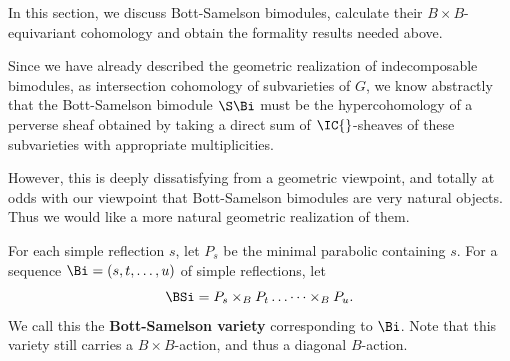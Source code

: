 \documentclass[12pt]{wart}
\newtheorem{prop}[thm]{Proposition}
\theoremstyle{remark}
\begin{document}
In this section, we discuss Bott-Samelson bimodules, calculate their
$B \times B$-equivariant cohomology and obtain the formality results
needed above.

Since we have already described the geometric realization of
indecomposable bimodules, as intersection cohomology of subvarieties
of $G$, we know abstractly that the Bott-Samelson bimodule $\S\Bi$
must be the hypercohomology of a perverse sheaf obtained by taking a
direct sum of $\IC{}$-sheaves of these subvarieties with appropriate
multiplicities.

However, this is deeply dissatisfying from a geometric viewpoint, and
totally at odds with our viewpoint that Bott-Samelson bimodules are
very natural objects. Thus we would like a more natural geometric
realization of them.

For each simple reflection $s$, let $P_s$ be the minimal parabolic containing $s$. For a sequence $\Bi = (s, t,  \dots, u)$ of simple reflections, let
\begin{equation*}
\BSi=P_s\times_{B} P_t \dots \cdots\times_{B}P_u.
\end{equation*}
We call this the {\bf Bott-Samelson variety} corresponding to $\Bi$.
Note that this variety still carries a $B\times B$-action, and thus a
diagonal $B$-action.

\end{document}
